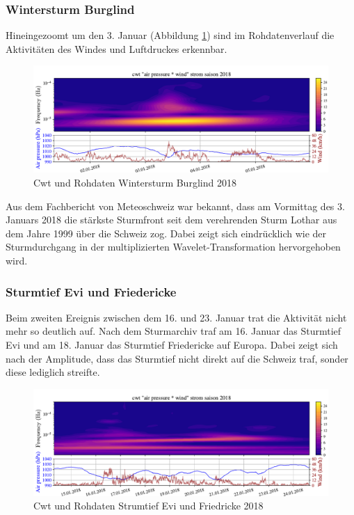 \begin{refsection}
\subsubsection{Wintersturm Burglind}
\label{burglind}
Hineingezoomt um den 3. Januar (Abbildung \ref{fig:cwt_storm_zoom}) sind im Rohdatenverlauf die Aktivitäten des Windes und Luftdruckes erkennbar. 
\begin{figure}
	\centering
	\includegraphics[width=1\textwidth]{papers/wwt/images/storm_airp_wind_zoom.pdf}
	\caption{Cwt und Rohdaten Wintersturm Burglind 2018}
	\label{fig:cwt_storm_zoom}
\end{figure}
Aus dem Fachbericht \space \cite{Fachbericht:Burglind} von Meteoschweiz war bekannt, dass am Vormittag des 3. Januars 2018 die stärkste Sturmfront seit dem verehrenden Sturm Lothar aus dem Jahre 1999 über die Schweiz zog.
Dabei zeigt sich eindrücklich wie der Sturmdurchgang in der multiplizierten Wavelet-Transformation hervorgehoben wird.

\subsubsection{Sturmtief Evi und Friedericke }
\label{evi}
Beim zweiten Ereignis zwischen dem 16. und 23. Januar trat die Aktivität nicht mehr so deutlich auf.
Nach dem Sturmarchiv  \cite{online:sturmarchiv} traf am 16. Januar das Sturmtief Evi und am 18. Januar das Sturmtief Friedericke auf Europa. Dabei zeigt sich nach der Amplitude, dass das Sturmtief nicht direkt auf die Schweiz traf, sonder diese lediglich streifte. 

\begin{figure}[b]
	\centering
	\includegraphics[width=1\textwidth]{papers/wwt/images/storm_airp_wind_zoom2.pdf}
	\caption{Cwt und Rohdaten Strumtief Evi und Friedricke 2018}
	\label{fig:cwt_storm_zoom2}
\end{figure}




\end{refsection}
